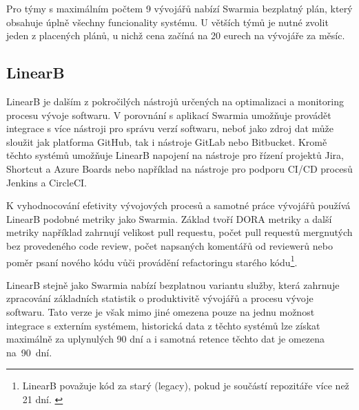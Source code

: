 Pro týmy s maximálním počtem 9 vývojářů nabízí Swarmia bezplatný plán, který obsahuje úplně všechny funcionality systému. U větších týmů je nutné zvolit jeden z placených plánů, u nichž cena začíná na 20 eurech na vývojáře za měsíc. \cite{Swarmia-pricing}

\subsection{LinearB}
LinearB je dalším z pokročilých nástrojů určených na optimalizaci a monitoring procesu vývoje softwaru. V porovnání s aplikací Swarmia umožňuje provádět integrace s více nástroji pro správu verzí softwaru, neboť jako zdroj dat může sloužit jak platforma GitHub, tak i nástroje GitLab nebo Bitbucket. Kromě těchto systémů umožňuje LinearB napojení na nástroje pro řízení projektů Jira, Shortcut a Azure Boards nebo například na nástroje pro podporu CI/CD procesů Jenkins a CircleCI. \cite{LinearB-integration}

K vyhodnocování efetivity vývojových procesů a samotné práce vývojářů používá LinearB podobné metriky jako Swarmia. Základ tvoří DORA metriky a další metriky například zahrnují velikost pull requestu, počet pull requestů mergnutých bez provedeného code review, počet napsaných komentářů od reviewerů nebo poměr psaní nového kódu vůči provádění refactoringu starého kódu\footnote{LinearB považuje kód za starý (legacy), pokud je součástí repozitáře více než 21 dní. \cite{LinearB-work-breakdown}}. \cite{LinearB-metrics}

LinearB stejně jako Swarmia nabízí bezplatnou variantu služby, která zahrnuje zpracování základních statistik o produktivitě vývojářů a procesu vývoje softwaru. Tato verze je však mimo jiné omezena pouze na jednu možnost integrace s externím systémem, historická data z těchto systémů lze získat maximálně za uplynulých 90 dní a i samotná retence těchto dat je omezena na~90~dní. \cite{LinearB-pricing}
